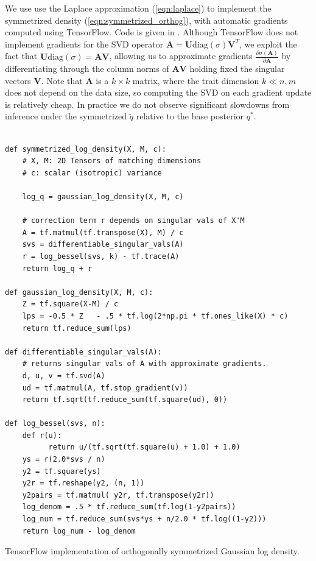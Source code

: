 \documentclass{article}
\newcommand{\diag}{\text{diag}}
\renewcommand{\v}[1]{\mathbf{#1}}
\begin{document}
We use use the Laplace approximation
(\ref{eqn:laplace}) to implement the symmetrized density
(\ref{eqn:symmetrized_orthog}), with automatic gradients computed
using TensorFlow. 
Code is given in . Although TensorFlow does not
implement gradients for the SVD
operator $\v{A} = \v{U} \diag(\sigma) \v{V}^T$, 
we exploit the fact that $\v{U}\diag(\sigma) = \v{A}\v{V}$, allowing us to
approximate gradients $\frac{\partial
  \sigma(\v{A}) }{\partial \v{A}}$ by differentiating through the
column norms of $\v{A}\v{V}$ holding fixed the singular vectors
$\v{V}$. Note that $\v{A}$ is a $k \times k$ matrix, where the trait
dimension $k \ll n, m$ does not depend on the data size, so computing the SVD on each
gradient update is relatively cheap. In practice we do not observe
significant slowdowns from inference under the symmetrized $\tilde{q}$
relative to the base posterior $q^*$.

\begin{listing}
\begin{verbatim}

def symmetrized_log_density(X, M, c):
    # X, M: 2D Tensors of matching dimensions
    # c: scalar (isotropic) variance
    
    log_q = gaussian_log_density(X, M, c)

    # correction term r depends on singular vals of X'M
    A = tf.matmul(tf.transpose(X), M) / c
    svs = differentiable_singular_vals(A)
    r = log_bessel(svs, k) - tf.trace(A)
    return log_q + r

def gaussian_log_density(X, M, c):
    Z = tf.square(X-M) / c
    lps = -0.5 * Z   - .5 * tf.log(2*np.pi * tf.ones_like(X) * c)
    return tf.reduce_sum(lps)

def differentiable_singular_vals(A):
    # returns singular vals of A with approximate gradients. 
    d, u, v = tf.svd(A)
    ud = tf.matmul(A, tf.stop_gradient(v))
    return tf.sqrt(tf.reduce_sum(tf.square(ud), 0))

def log_bessel(svs, n):
    def r(u):
          return u/(tf.sqrt(tf.square(u) + 1.0) + 1.0)
    ys = r(2.0*svs / n)
    y2 = tf.square(ys)
    y2r = tf.reshape(y2, (n, 1))
    y2pairs = tf.matmul( y2r, tf.transpose(y2r))
    log_denom = .5 * tf.reduce_sum(tf.log(1-y2pairs))
    log_num = tf.reduce_sum(svs*ys + n/2.0 * tf.log((1-y2)))
    return log_num - log_denom

\end{verbatim}
\caption{TensorFlow implementation of orthogonally symmetrized
  Gaussian log density.}
\label{listing:stuff}
\end{listing}
\end{document}
